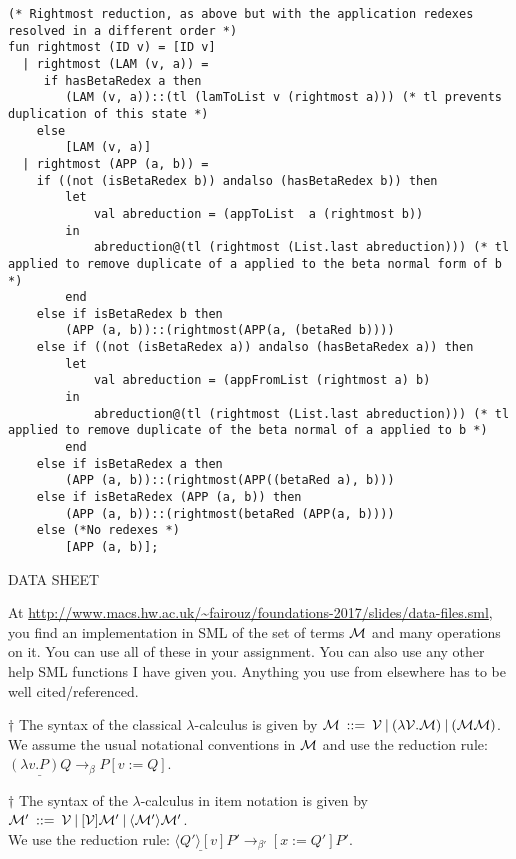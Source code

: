 \documentclass[11pt]{article}
\begin{document}
\begin{enumerate}
\begin{verbatim}
(* Rightmost reduction, as above but with the application redexes resolved in a different order *)
fun rightmost (ID v) = [ID v]
  | rightmost (LAM (v, a)) =
	 if hasBetaRedex a then
		(LAM (v, a))::(tl (lamToList v (rightmost a))) (* tl prevents duplication of this state *)
	else
		[LAM (v, a)]
  | rightmost (APP (a, b)) =
  	if ((not (isBetaRedex b)) andalso (hasBetaRedex b)) then 
		let
			val abreduction = (appToList  a (rightmost b))
		in
			abreduction@(tl (rightmost (List.last abreduction))) (* tl applied to remove duplicate of a applied to the beta normal form of b *)
		end
	else if isBetaRedex b then
		(APP (a, b))::(rightmost(APP(a, (betaRed b))))
	else if ((not (isBetaRedex a)) andalso (hasBetaRedex a)) then
		let
			val abreduction = (appFromList (rightmost a) b)
		in
			abreduction@(tl (rightmost (List.last abreduction))) (* tl applied to remove duplicate of the beta normal of a applied to b *)
		end
	else if isBetaRedex a then
		(APP (a, b))::(rightmost(APP((betaRed a), b)))
	else if isBetaRedex (APP (a, b)) then
		(APP (a, b))::(rightmost(betaRed (APP(a, b))))
	else (*No redexes *)
		[APP (a, b)];
\end{verbatim}

\end{enumerate}
\newpage

\begin{center}
\Huge{DATA SHEET}
\end{center}


At \url{http://www.macs.hw.ac.uk/~fairouz/foundations-2017/slides/data-files.sml}, you find an implementation in SML of the set of
terms ${\cal M}$ and many operations on it.  You can use all of these in your assignment.  You can also use any other help SML functions I have given you.  Anything you use from elsewhere has to be well cited/referenced.

$\dagger$ The syntax of the classical $\lambda$-calculus is given by
${\cal M}  \: ::=  \:  {\cal V} \:|\: ( \lambda{{\cal V}}.{{\cal M}}) \:|\: ( {\cal M} {\cal M})$.\\
We assume the usual notational conventions in ${\cal M}$ and use 
the reduction rule: \\$\underline{(\lambda v. P)Q} \rightarrow_\beta P[v:=Q]$.

$\dagger$ The syntax of the  $\lambda$-calculus in item notation is given by
${\cal M}'  \: ::=  \:  {\cal V} \:|\: [{\cal V}]{\cal M}' \:|\: \langle{\cal M}'\rangle{\cal M}'$.\\
We use the reduction rule: 
$ \underline{\langle Q'\rangle[v]}P' \rightarrow_{\beta'} [x:=Q']P'$.
\end{document}
